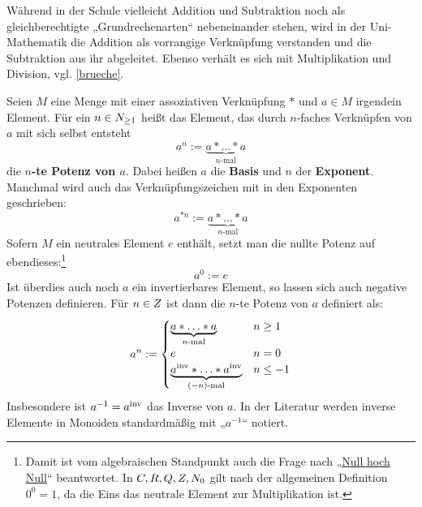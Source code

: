 \begin{bem}
    Während in der Schule vielleicht Addition und Subtraktion noch als gleichberechtigte „Grundrechenarten“ nebeneinander stehen, wird in der Uni-Mathematik die Addition als vorrangige Verknüpfung verstanden und die Subtraktion aus ihr abgeleitet. Ebenso verhält es sich mit Multiplikation und Division, vgl. \cref{brueche}.
\end{bem}


\begin{defin}[* Potenzen] \label{def:potenz}  
    Seien $M$ eine Menge mit einer assoziativen Verknüpfung $*$ und $a\in M$ irgendein Element. Für ein $n\in \relax N_{\ge 1}$ heißt das Element, das durch $n$-faches Verknüpfen von $a$ mit sich selbst entsteht
    \[ a^n := \underbrace{a * \ldots * a}_{n\text{-mal}} \]
    die \textbf{$n$-te Potenz von $a$}. Dabei heißen $a$ die \textbf{Basis} und $n$ der \textbf{Exponent}. Manchmal wird auch das Verknüpfungszeichen mit in den Exponenten geschrieben:
            \[ a^{*n} := \underbrace{a * \ldots * a}_{n\text{-mal}} \]
    Sofern $M$ ein neutrales Element $e$ enthält, setzt man die nullte Potenz auf ebendieses:\footnote{Damit ist vom algebraischen Standpunkt auch die Frage nach „\href{https://en.wikipedia.org/wiki/Zero_to_the_power_of_zero}{Null hoch Null}“ beantwortet. In $\relax C,\relax R,\relax Q,\relax Z,\relax N_0$ gilt nach der allgemeinen Definition $0^0=1$, da die Eins das neutrale Element zur Multiplikation ist.}
        \[ a^0 := e \]
    Ist überdies auch noch $a$ ein invertierbares Element, so lassen sich auch negative Potenzen definieren. Für $n\in \relax Z$ ist dann die $n$-te Potenz von $a$ definiert als:
    \begin{align*}
        a^n := \begin{cases}
            \underbrace{a* \ldots * a}_{n\text{-mal}} & n \ge 1 \\
            e & n= 0 \\
            \underbrace{a^{\mathrm{inv}} * \ldots * a^{\mathrm{inv}}}_{(-n)\text{-mal}} & n \le -1
        \end{cases}
    \end{align*}
    Insbesondere ist $a^{-1}=a^{\mathrm{inv}}$ das Inverse von $a$. In der Literatur werden inverse Elemente in Monoiden standardmäßig mit „$a^{-1}$“ notiert.
\end{defin}

